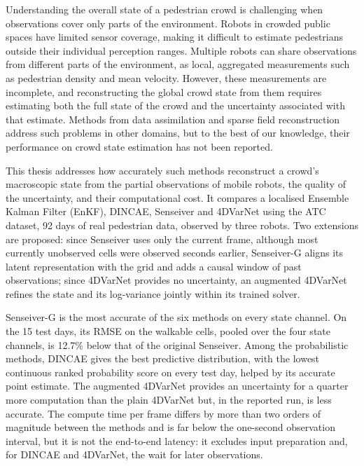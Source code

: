 \documentclass[english, 12pt, a4paper, elec, utf8, a-2b, online]{aaltothesis}
\date{November 2026}
\begin{document}
\makecoverpage

\makecopyrightpage

\clearpage

\begin{abstractpage}[english]
Understanding the overall state of a pedestrian crowd is challenging when
observations cover only parts of the environment. Robots in crowded public spaces have limited sensor coverage,
making it difficult to estimate pedestrians outside their individual perception
ranges. Multiple robots can share observations from different parts of the
environment, as local, aggregated measurements such as pedestrian density and
mean velocity. However, these measurements are incomplete, and reconstructing
the global crowd state from them requires estimating both the full state of the
crowd and the uncertainty associated with that estimate. Methods from data
assimilation and sparse field reconstruction address such problems in other
domains, but to the best of our knowledge, their performance on crowd state
estimation has not been reported.

This thesis addresses how accurately such methods reconstruct a crowd's
macroscopic state from the partial observations of mobile robots, the quality
of the uncertainty, and their computational cost. It
compares a localised Ensemble Kalman Filter (EnKF), DINCAE, Senseiver and
4DVarNet using the ATC dataset, 92 days of real pedestrian data, observed by
three robots. Two extensions
are proposed: since Senseiver uses only the current
frame, although most currently unobserved cells were observed seconds earlier,
Senseiver-G aligns its latent representation with the grid and adds a causal
window of past observations; since 4DVarNet provides no uncertainty, an
augmented 4DVarNet refines the state and its log-variance jointly within its
trained solver.

Senseiver-G is the most accurate of the six methods on every state channel. On
the 15 test days, its RMSE on the walkable cells, pooled over the four state
channels, is 12.7\% below that of the original Senseiver. Among the probabilistic methods, DINCAE gives
the best predictive distribution, with the lowest
continuous ranked probability score on every test day, helped by its accurate point estimate. The augmented
4DVarNet provides an uncertainty for a quarter more computation than the plain
4DVarNet but, in the reported run, is less accurate. The compute time per
frame differs by more than two orders of magnitude between the methods and is
far below the one-second observation interval, but it is not the end-to-end
latency: it excludes input preparation and, for DINCAE and 4DVarNet, the wait
for later observations.

\end{abstractpage}
\end{document}
